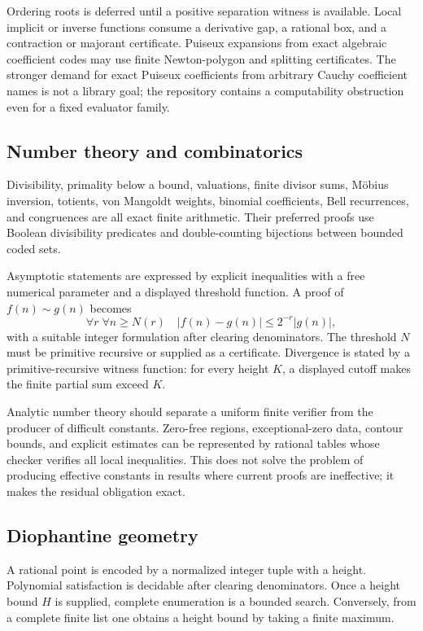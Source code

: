 Ordering roots is deferred until a positive separation witness is available.
Local implicit or inverse functions consume a derivative gap, a rational box,
and a contraction or majorant certificate.  Puiseux expansions from exact
algebraic coefficient codes may use finite Newton-polygon and splitting
certificates.  The stronger demand for exact Puiseux coefficients from
arbitrary Cauchy coefficient names is not a library goal; the repository
contains a computability obstruction even for a fixed evaluator family.

\subsection{Number theory and combinatorics}

Divisibility, primality below a bound, valuations, finite divisor sums,
M\"obius inversion, totients, von Mangoldt weights, binomial coefficients,
Bell recurrences, and congruences are all exact finite arithmetic.  Their
preferred proofs use Boolean divisibility predicates and double-counting
bijections between bounded coded sets.

Asymptotic statements are expressed by explicit inequalities with a free
numerical parameter and a displayed threshold function.  A proof of
\(f(n)\sim g(n)\) becomes
\[
 \forall r\;\forall n\ge N(r)\quad
 |f(n)-g(n)|\le 2^{-r}|g(n)|,
\]
with a suitable integer formulation after clearing denominators.  The
threshold \(N\) must be primitive recursive or supplied as a certificate.
Divergence is stated by a primitive-recursive witness function: for every
height \(K\), a displayed cutoff makes the finite partial sum exceed \(K\).

Analytic number theory should separate a uniform finite verifier from the
producer of difficult constants.  Zero-free regions, exceptional-zero data,
contour bounds, and explicit estimates can be represented by rational tables
whose checker verifies all local inequalities.  This does not solve the
problem of producing effective constants in results where current proofs are
ineffective; it makes the residual obligation exact.

\subsection{Diophantine geometry}

A rational point is encoded by a normalized integer tuple with a height.
Polynomial satisfaction is decidable after clearing denominators.  Once a
height bound \(H\) is supplied, complete enumeration is a bounded search.
Conversely, from a complete finite list one obtains a height bound by taking a
finite maximum.

